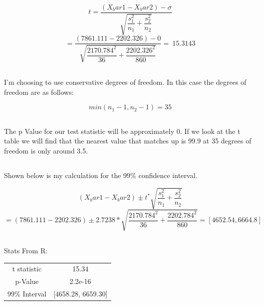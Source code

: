 \documentclass[letterpaper, onecolumn,10pt]{IEEEtran}
\begin{document}
                    \[
                        t=\dfrac{(X_bar1 - X_bar2)-\sigma}{\sqrt{\dfrac{s^2_1}{n_1} + \dfrac{s^2_2}{n_2}}}
                    \]
                    \[
                        =\dfrac{(7861.111-2202.326) - 0}{\sqrt{\dfrac{2170.784^2}{36} + \dfrac{2202.326^2}{860}}} =~15.3143
                    \]
                \subsection{}
                    I'm choosing to use conservative degrees of freedom. In this case the degrees of freedom are as follows:
                    
                    \[
                        min(n_1 - 1, n_2 -1) = 35
                    \]
                \subsection{}
                    The p Value for our test statistic will be approximately 0. If we look at the t table we will find that the nearest value that matches up is 99.9 at 35 degrees of freedom is only around 3.5.\\
                
                \subsection{}
                    Shown below is my calculation for the 99\% confidence interval.
                    
                    \[
                        (X_bar1 - X_bar2) \pm t^* \sqrt{\dfrac{s^2_1}{n_1}+\dfrac{s^2_2}{n_2}}
                    \]
                    \[
                        = (7861.111 - 2202.326) \pm  2.7238 * \sqrt{\dfrac{2170.784^2}{36}+\dfrac{2202.784^2}{860}} = [4652.54, 6664.8]
                    \]
                \subsection{}
                    Stats From R:
                    \begin{table}[ht]
                        \centering
                        \begin{tabular}{c|c}
                            t statistic & 15.34\\
                            p-Value & 2.2e-16\\
                            99\% Interval & [4658.28, 6659.30]\\
                        \end{tabular}
                    \end{table}
                    
\end{document}
